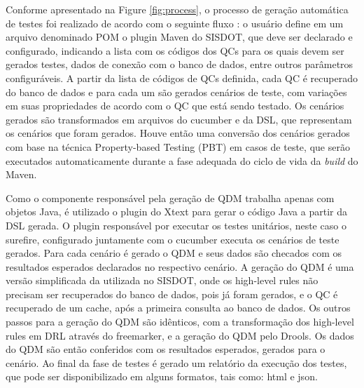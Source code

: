 
Conforme apresentado na Figure \ref{fig:process}, o processo de geração automática de testes foi realizado de acordo com o seguinte fluxo : o usuário define em um arquivo denominado POM o plugin Maven do SISDOT, que deve ser declarado e configurado, indicando a lista com os códigos dos QCs para os quais devem ser gerados testes, dados de conexão com o banco de dados, entre outros parâmetros configuráveis. A partir da lista de códigos de QCs definida, cada QC é recuperado do banco de dados e para cada um são gerados cenários de teste, com variações em suas propriedades de acordo com o QC que está sendo testado. Os cenários gerados são transformados em arquivos do cucumber e da DSL, que representam os cenários que foram gerados. Houve então uma conversão dos cenários gerados com base na técnica Property-based Testing (PBT) em casos de teste, que serão executados automaticamente durante a fase adequada do ciclo de vida da \textit{build} do Maven. 

Como o componente responsável pela geração de QDM trabalha apenas com objetos Java, é utilizado o plugin do Xtext para gerar o código Java a partir da DSL gerada. O plugin responsável por executar os testes unitários, neste caso o surefire, configurado juntamente com o cucumber executa os cenários de teste gerados. Para cada cenário é gerado o QDM e seus dados são checados com os resultados esperados declarados no respectivo cenário. A geração do QDM é uma versão simplificada da utilizada no SISDOT, onde os high-level rules não precisam ser recuperados do banco de dados, pois já foram gerados, e o QC é recuperado de um cache, após a primeira consulta ao banco de dados. Os outros passos para a geração do QDM são idênticos, com a transformação dos high-level rules em DRL através do freemarker, e a geração do QDM pelo Drools. Os dados do QDM são então conferidos com os resultados esperados, gerados para o cenário. Ao final da fase de testes é gerado um relatório da execução dos testes, que pode ser disponibilizado em alguns formatos, tais como: html e json.

